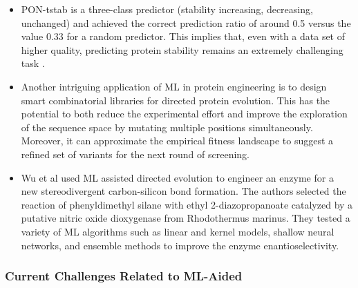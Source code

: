 \documentclass[12pt]{article}
\begin{document}
\begin{itemize}
\item PON-tstab is a three-class predictor (stability increasing, decreasing, unchanged) and achieved the correct prediction ratio of around 0.5 versus the value 0.33 for a random predictor. This implies that, even with a data set of higher quality, predicting protein stability remains an extremely challenging task \cite{5}.

\item Another intriguing application of ML in protein engineering is to design smart combinatorial libraries for directed protein evolution\cite{70}. This has the potential to both reduce the experimental eﬀort and improve the exploration of the sequence space by mutating multiple positions simultaneously. Moreover, it can approximate the empirical ﬁtness landscape to suggest a reﬁned set of variants for the next round of screening.

\item Wu et al\cite{71} used ML assisted directed evolution to engineer an enzyme for a new stereodivergent carbon-silicon bond formation. The authors selected the reaction of phenyldimethyl silane with ethyl 2-diazopropanoate catalyzed by a putative nitric oxide dioxygenase from Rhodothermus marinus. They tested a variety of ML algorithms such as linear and kernel models, shallow neural networks, and ensemble methods to improve the enzyme enantioselectivity.

\end{itemize}


 
\subsubsection{Current Challenges Related to ML-Aided}
\end{document}
